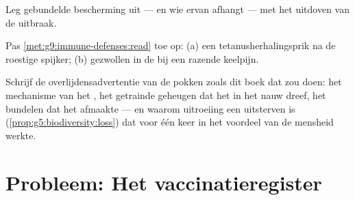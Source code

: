 \begin{exercise}[$\star\star$]\label{exo:g9:immune-defenses:10}
Leg gebundelde bescherming uit --- en wie ervan afhangt --- met het
uitdoven van de uitbraak.
\end{exercise}

\begin{exercise}[$\star\star$]\label{exo:g9:immune-defenses:11}
Pas \cref{met:g9:immune-defenses:read} toe op: (a) een
tetanusherhalingsprik na de roestige spijker; (b) gezwollen 
in de  bij een razende keelpijn.
\end{exercise}

\begin{exercise}[$\star\star\star$]\label{exo:g9:immune-defenses:12}
Schrijf de overlijdensadvertentie van de pokken zoals dit boek dat
zou doen: het mechanisme van het , het getrainde geheugen dat
het in het nauw dreef, het bundelen dat het afmaakte --- en waarom
uitroeiing een uitsterven is (\cref{prop:g5:biodiversity:loss}) dat
voor één keer in het voordeel van de mensheid werkte.
\end{exercise}

\section{Probleem: Het vaccinatieregister}

